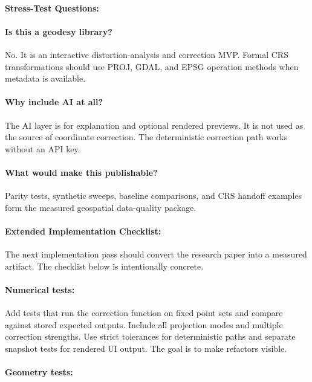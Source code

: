 \documentclass{article}
\begin{document}
\paragraph{Stress-Test Questions:}

\paragraph{Is this a geodesy library?}
No. It is an interactive distortion-analysis and correction MVP. Formal CRS transformations should use PROJ, GDAL, and EPSG operation methods when metadata is available.

\paragraph{Why include AI at all?}
The AI layer is for explanation and optional rendered previews. It is not used as the source of coordinate correction. The deterministic correction path works without an API key.

\paragraph{What would make this publishable?}
Parity tests, synthetic sweeps, baseline comparisons, and CRS handoff examples form the measured geospatial data-quality package.

\paragraph{Extended Implementation Checklist:}

The next implementation pass should convert the research paper into a measured artifact. The checklist below is intentionally concrete.

\paragraph{Numerical tests:}

Add tests that run the correction function on fixed point sets and compare against stored expected outputs. Include all projection modes and multiple correction strengths. Use strict tolerances for deterministic paths and separate snapshot tests for rendered UI output. The goal is to make refactors visible.

\paragraph{Geometry tests:}
\end{document}
